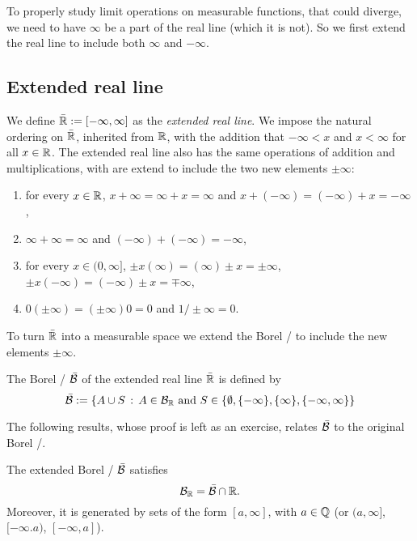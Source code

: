 To properly study limit operations on measurable functions, that could diverge, we need to have $\infty$ be a part of the real line (which it is not). So we first extend the real line to include both $\infty$ and $-\infty$.

\subsection{Extended real line}

We define $\bar{\mathbb R} := [-\infty, \infty]$ as the \emph{extended real line}. We impose the natural ordering on $\bar{\mathbb R}$, inherited from $\mathbb R$, with the addition that $-\infty < x$ and $x < \infty$ for all $x \in \mathbb R$. The extended real line also has the same operations of addition and multiplications, with are extend to include the two new elements $\pm \infty$:
\begin{enumerate}
\item for every $x\in \mathbb R$, $x + \infty = \infty + x = \infty$ and $x + (-\infty) = (-\infty) + x = -\infty$,
\item $\infty + \infty = \infty$ and $(-\infty) + (-\infty) = -\infty$,
\item for every $x \in (0,\infty]$, $\pm x (\infty) = (\infty) \pm x = \pm \infty$, $\pm x (-\infty) = (-\infty) \pm x = \mp \infty$,
\item $0 (\pm \infty) = (\pm \infty) 0 = 0$ and $1/\pm \infty = 0$.
\end{enumerate}

To turn $\bar{\mathbb R}$ into a measurable space we extend the Borel \sigalg/ to include the new elements $\pm \infty$.

\begin{definition}
The Borel \sigalg/ $\bar{\mathcal B}$ of the extended real line $\bar{\mathbb R}$ is defined by
\[
	\bar{\mathcal B} := \{A \cup S \, :\, A \in \mathcal B_{\mathbb R} \text{ and } S \in \{\emptyset, \{-\infty\}, \{\infty\}, \{-\infty, \infty\}\}
\]
\end{definition}

The following results, whose proof is left as an exercise, relates $\bar{\mathcal B}$ to the original Borel \sigalg/.

\begin{lemma}\label{lem:characterization_extended_borel}
The extended Borel \sigalg/ $\bar{\mathcal B}$ satisfies
\[
	\mathcal B_{\mathbb R} = \bar{\mathcal B} \cap \mathbb R.
\]
Moreover, it is generated by sets of the form $[a,\infty]$, with $a \in \mathbb Q$ (or $(a,\infty]$, $[-\infty.a)$, $[-\infty,a]$).
\end{lemma}

